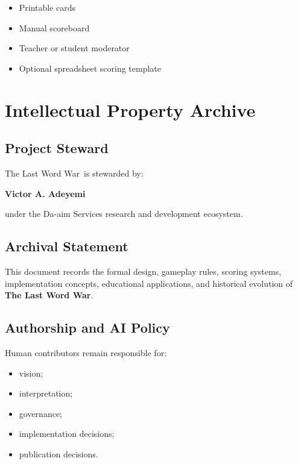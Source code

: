 \documentclass[11pt,a4paper]{article}
\begin{document}
\begin{itemize}
    \item Printable cards
    \item Manual scoreboard
    \item Teacher or student moderator
    \item Optional spreadsheet scoring template
\end{itemize}

\section{Intellectual Property Archive}

\subsection{Project Steward}

The Last Word War\texttrademark\ is stewarded by:

\begin{center}
\textbf{Victor A. Adeyemi}
\end{center}

under the Da-aim Services research and development ecosystem.

\subsection{Archival Statement}

This document records the formal design, gameplay rules, scoring systems, implementation concepts, educational applications, and historical evolution of \textbf{The Last Word War\texttrademark}.

\subsection{Authorship and AI Policy}

Human contributors remain responsible for:

\begin{itemize}
    \item vision;
    \item interpretation;
    \item governance;
    \item implementation decisions;
    \item publication decisions.
\end{itemize}
\end{document}
